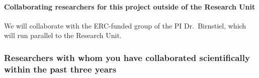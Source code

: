 \documentclass[10pt,fleqn,twoside]{article}
\begin{document}
\paragraph{Collaborating researchers for this project outside of
  the Research Unit}

We will collaborate with the ERC-funded group of the PI Dr.\ Birnstiel,
which will run parallel to the Research Unit.


\subsubsection{Researchers with whom you have collaborated scientifically within the past three years}
\end{document}
